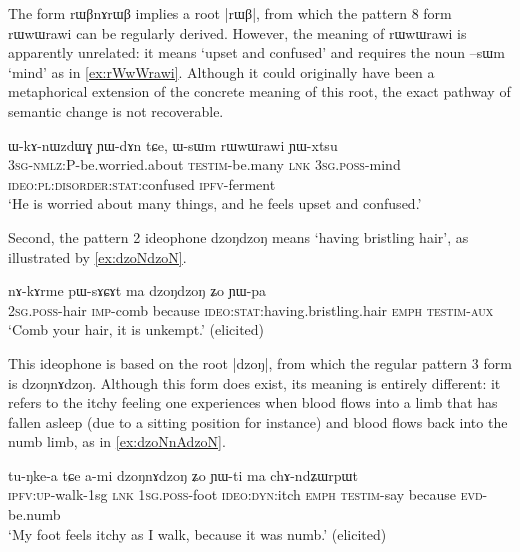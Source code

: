 \documentclass[oldfontcommands,oneside,a4paper,11pt]{article}
\newcommand{\ipa}[1]{{\phon \mbox{#1}}} %
\begin{document}
The form  \ipa{rɯβnɤrɯβ} implies a root |\ipa{rɯβ}|, from which the pattern 8 form \ipa{rɯwɯrawi} can be regularly derived. However, the meaning of \ipa{rɯwɯrawi} is apparently unrelated: it means `upset and confused' and requires the noun \ipa{--sɯm} `mind' as in \ref{ex:rWwWrawi}. Although it could originally have been a metaphorical extension of the concrete meaning of this root, the  exact pathway of semantic change is not recoverable.

  \begin{exe} 
\ex  \label{ex:rWwWrawi}
\gll 
\ipa{ɯ-kɤ-nɯzdɯɣ}  	\ipa{ɲɯ-dɤn}  	\ipa{tɕe,}  	\ipa{ɯ-sɯm}  	\ipa{rɯwɯrawi}  	\ipa{ɲɯ-xtsu}  	  \\
\textsc{3sg-nmlz:}P-be.worried.about \textsc{testim}-be.many \textsc{lnk} \textsc{3sg.poss}-mind \textsc{ideo:pl:disorder:stat}:confused \textsc{ipfv}-ferment   \\
\glt `He is worried about many things, and he feels upset and confused.'
  \end{exe}

Second, the  pattern 2 ideophone \ipa{dzoŋdzoŋ} means `having bristling hair', as illustrated by \ref{ex:dzoNdzoN}. 

  \begin{exe} 
\ex  \label{ex:dzoNdzoN}
\gll 
\ipa{nɤ-kɤrme}  	\ipa{pɯ-sɤɕɤt}  	\ipa{ma}  	\ipa{dzoŋdzoŋ}  	\ipa{ʑo}  	\ipa{ɲɯ-pa}  \\
\textsc{2sg.poss}-hair \textsc{imp}-comb because \textsc{ideo:stat}:having.bristling.hair \textsc{emph} \textsc{testim}-\textsc{aux} \\
\glt `Comb your hair, it is unkempt.' (elicited)
  \end{exe}

This ideophone is based on the root |\ipa{dzoŋ}|, from which the regular pattern 3 form is \ipa{dzoŋnɤdzoŋ}. Although this form does exist, its meaning is entirely different: it refers to the itchy feeling  one experiences when blood flows into a limb that has fallen asleep (due to a sitting position for instance) and blood flows back into the numb limb, as in \ref{ex:dzoNnAdzoN}.

  \begin{exe} 
\ex  \label{ex:dzoNnAdzoN}
\gll 
\ipa{tu-ŋke-a}  	\ipa{tɕe}  	\ipa{a-mi}  	\ipa{dzoŋnɤdzoŋ}  	\ipa{ʑo}  	\ipa{ɲɯ-ti}  	\ipa{ma}  	\ipa{chɤ-ndʑɯrpɯt}  \\
\textsc{ipfv:up}-walk-1sg \textsc{lnk} 1\textsc{sg.poss}-foot \textsc{ideo:dyn}:itch \textsc{emph} \textsc{testim}-say because \textsc{evd}-be.numb \\
\glt `My foot feels itchy as I walk, because it was numb.' (elicited)
  \end{exe}
  
\end{document}

